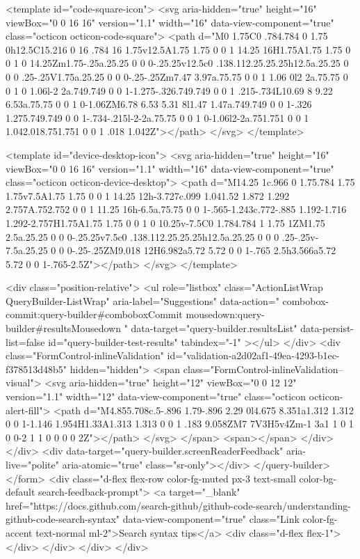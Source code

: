 <template id="code-square-icon">
  <svg aria-hidden="true" height="16" viewBox="0 0 16 16" version="1.1" width="16" data-view-component="true" class="octicon octicon-code-square">
    <path d="M0 1.75C0 .784.784 0 1.75 0h12.5C15.216 0 16 .784 16 1.75v12.5A1.75 1.75 0 0 1 14.25 16H1.75A1.75 1.75 0 0 1 0 14.25Zm1.75-.25a.25.25 0 0 0-.25.25v12.5c0 .138.112.25.25.25h12.5a.25.25 0 0 0 .25-.25V1.75a.25.25 0 0 0-.25-.25Zm7.47 3.97a.75.75 0 0 1 1.06 0l2 2a.75.75 0 0 1 0 1.06l-2 2a.749.749 0 0 1-1.275-.326.749.749 0 0 1 .215-.734L10.69 8 9.22 6.53a.75.75 0 0 1 0-1.06ZM6.78 6.53 5.31 8l1.47 1.47a.749.749 0 0 1-.326 1.275.749.749 0 0 1-.734-.215l-2-2a.75.75 0 0 1 0-1.06l2-2a.751.751 0 0 1 1.042.018.751.751 0 0 1 .018 1.042Z"></path>
</svg>
</template>

<template id="device-desktop-icon">
  <svg aria-hidden="true" height="16" viewBox="0 0 16 16" version="1.1" width="16" data-view-component="true" class="octicon octicon-device-desktop">
    <path d="M14.25 1c.966 0 1.75.784 1.75 1.75v7.5A1.75 1.75 0 0 1 14.25 12h-3.727c.099 1.041.52 1.872 1.292 2.757A.752.752 0 0 1 11.25 16h-6.5a.75.75 0 0 1-.565-1.243c.772-.885 1.192-1.716 1.292-2.757H1.75A1.75 1.75 0 0 1 0 10.25v-7.5C0 1.784.784 1 1.75 1ZM1.75 2.5a.25.25 0 0 0-.25.25v7.5c0 .138.112.25.25.25h12.5a.25.25 0 0 0 .25-.25v-7.5a.25.25 0 0 0-.25-.25ZM9.018 12H6.982a5.72 5.72 0 0 1-.765 2.5h3.566a5.72 5.72 0 0 1-.765-2.5Z"></path>
</svg>
</template>

        <div class="position-relative">
                <ul
                  role="listbox"
                  class="ActionListWrap QueryBuilder-ListWrap"
                  aria-label="Suggestions"
                  data-action="
                    combobox-commit:query-builder#comboboxCommit
                    mousedown:query-builder#resultsMousedown
                  "
                  data-target="query-builder.resultsList"
                  data-persist-list=false
                  id="query-builder-test-results"
                  tabindex="-1"
                ></ul>
        </div>
      <div class="FormControl-inlineValidation" id="validation-a2d02af1-49ea-4293-b1ec-f378513d48b5" hidden="hidden">
        <span class="FormControl-inlineValidation--visual">
          <svg aria-hidden="true" height="12" viewBox="0 0 12 12" version="1.1" width="12" data-view-component="true" class="octicon octicon-alert-fill">
    <path d="M4.855.708c.5-.896 1.79-.896 2.29 0l4.675 8.351a1.312 1.312 0 0 1-1.146 1.954H1.33A1.313 1.313 0 0 1 .183 9.058ZM7 7V3H5v4Zm-1 3a1 1 0 1 0 0-2 1 1 0 0 0 0 2Z"></path>
</svg>
        </span>
        <span></span>
</div>    </div>
    <div data-target="query-builder.screenReaderFeedback" aria-live="polite" aria-atomic="true" class="sr-only"></div>
</query-builder></form>
          <div class="d-flex flex-row color-fg-muted px-3 text-small color-bg-default search-feedback-prompt">
            <a target="_blank" href="https://docs.github.com/search-github/github-code-search/understanding-github-code-search-syntax" data-view-component="true" class="Link color-fg-accent text-normal ml-2">Search syntax tips</a>            <div class="d-flex flex-1"></div>
          </div>
        </div>
</div>

